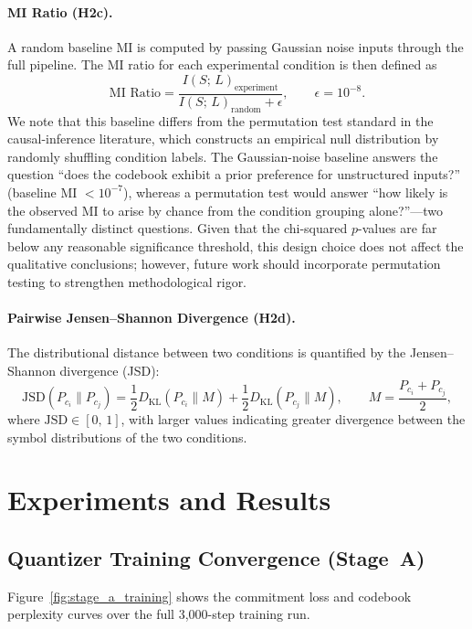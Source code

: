 \documentclass{article}
\begin{document}
\paragraph{MI Ratio (H2c).}
A random baseline MI is computed by passing Gaussian noise inputs through the
full pipeline.  The MI ratio for each experimental condition is then defined as
%
\begin{equation}
  \text{MI Ratio}
  = \frac{I(S;\,L)_{\text{experiment}}}
         {I(S;\,L)_{\text{random}} + \epsilon},
  \qquad \epsilon = 10^{-8}.
\end{equation}
%
We note that this baseline differs from the permutation test standard in the
causal-inference literature, which constructs an empirical null distribution by
randomly shuffling condition labels.  The Gaussian-noise baseline answers the
question ``does the codebook exhibit a prior preference for unstructured
inputs?'' (baseline MI $< 10^{-7}$), whereas a permutation test would answer
``how likely is the observed MI to arise by chance from the condition grouping
alone?''---two fundamentally distinct questions.  Given that the chi-squared
$p$-values are far below any reasonable significance threshold, this design
choice does not affect the qualitative conclusions; however, future work should
incorporate permutation testing to strengthen methodological rigor.

\paragraph{Pairwise Jensen--Shannon Divergence (H2d).}
The distributional distance between two conditions is quantified by the
Jensen--Shannon divergence (JSD):
%
\begin{equation}
  \mathrm{JSD}(P_{c_i} \| P_{c_j})
  = \frac{1}{2}D_{\mathrm{KL}}(P_{c_i} \| M)
  + \frac{1}{2}D_{\mathrm{KL}}(P_{c_j} \| M),
  \qquad
  M = \frac{P_{c_i} + P_{c_j}}{2},
\end{equation}
%
where $\mathrm{JSD} \in [0,\,1]$, with larger values indicating greater
divergence between the symbol distributions of the two conditions.
\section{Experiments and Results} 
\subsection{Quantizer Training Convergence (Stage~A)}

Figure~\ref{fig:stage_a_training} shows the commitment loss and codebook
perplexity curves over the full 3,000-step training run.
\end{document}
